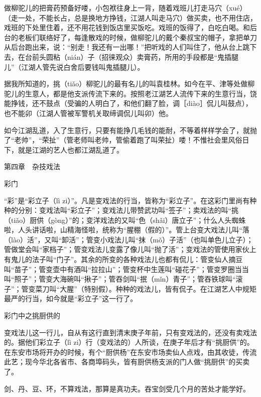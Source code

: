 \documentclass[12pt,UTF8]{ctexbook}
\begin{document}
做柳驼儿的把膏药预备好喽，小包袱往身上一背，随着戏班儿打走马穴（xué）（走一处，不能长占，总是换地方挣钱，江湖人叫走马穴）做买卖，也不用住店，戏班的下处里住着，还不用花钱到饭店里买饭吃。戏班的饭得了，白吃白喝。和后台的老板们联络好了，每逢散戏的时候，做柳驼儿的戴个秦叔宝的帽子，拿把单刀从后台跑出来，说：“别走！我还有一出哪！”把听戏的人们叫住了，他从台上跳下去，在台前头圆粘（nián）子（招徕观众）卖膏药，所用的手段都是“鬼插腿儿”（江湖人管先说白舍后要钱叫鬼插腿儿）。

据我所知道的，挑（tiǎo）柳驼儿的最有名儿的叫袁桂林。如今在平、津等处做柳驼儿的生意人，都是他支派传流下来的。按照老江湖艺人流传下来的生意行当，饶能挣钱，还不鼓点（受骗的人明白了，和他们翻了脸，调［diào］侃儿叫鼓点），也不能卯（江湖人管被军警机关取缔调侃儿叫卯）他。

如今江湖乱道，入了生意行，只要有能挣几毛钱的能耐，不等着样样学会了，就抛了“老帅”，“荣扯”（管老师叫老帅，管偷着跑了叫荣扯）喽！不惟社会里风俗日下，就是江湖的艺人也都江湖乱道了。





第四章　杂技戏法


彩门


“彩”是“彩立子（lì zi）”。凡是变戏法的行当，皆称为“彩立子”。在这彩门里尚有种种的分别：变戏法叫“彩立子”；变戏法儿带赞武功叫“签子”；卖戏法的叫“挑（tiǎo）厨供（gòng）”的；变洋戏法的又叫“色（shǎi）唐立子”；什么人头蜘蛛啦，人头讲话啦，山精海怪啦，统称为“腥棚（假的）”。管上台变大戏法儿叫“落（lào）活”，又叫“卸活”；管变小戏法儿叫“抹（mǒ）子活”（也叫单色儿立子）；管做堂会叫“家档子”；管变戏法儿变露了像儿叫“抛了活”；变戏法的管使用家伙上有鬼儿的法子叫“门子”。其余的所变的各种戏法儿也都有侃儿：管变仙人摘豆叫“苗子”；管变壶中有酒叫“拉拉山”；管变杯中生莲叫“碰花子”；管变罗圈当当叫“照子”；管变大海碗叫“揪子”；管吞剑叫“抿（mǐn）青子”；管吞铁球叫“滚子”；管变菜刀叫“大腥”（特别假）。种种的戏法儿，皆有侃子。在江湖艺人中规矩最严的行当，如今就是“彩立子”这一行了。





彩门中之挑厨供的


变戏法儿这一行儿，自从有这行直到清末庚子年前，只有变戏法的，还没有卖戏法的。据他们彩立子（lì zi）行（变戏法的）人所谈，在庚子年后才有“挑厨供”的。在东安市场将开办的时候，有个“厨供杨”在东安市场卖仙人点戏，由其收徒，传流此艺；现今华北各省市、各商埠码头，皆有厨供杨支派的门人做“挑厨供”的买卖了。

剑、丹、豆、环，不算戏法，那算是真功夫。吞宝剑受几个月的苦处才能学好。
\end{document}
